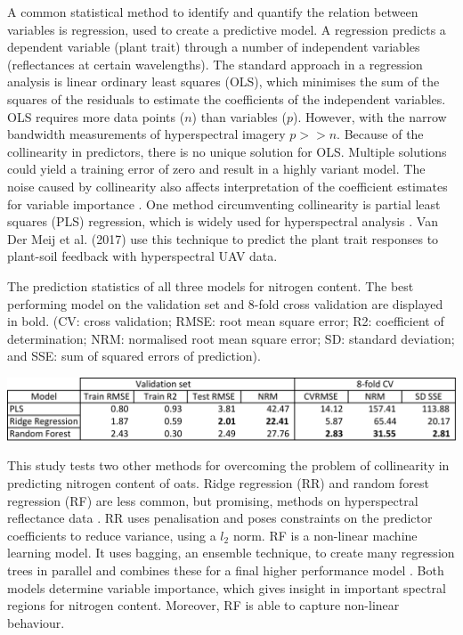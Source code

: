 \documentclass{isprs}
\begin{document}
A common statistical method to identify and quantify the relation between variables is regression, used to create a predictive model. A regression predicts a dependent variable (plant trait) through a number of independent variables (reflectances at certain wavelengths). The standard approach in a regression analysis is linear ordinary least squares (OLS), which minimises the sum of the squares of the residuals to estimate the coefficients of the independent variables. OLS requires more data points ($n$) than variables ($p$). However, with the narrow bandwidth measurements of hyperspectral imagery $p >> n$.  Because of the collinearity in predictors, there is no unique solution for OLS. Multiple solutions could yield a training error of zero and result in a highly variant model. The noise caused by collinearity also affects interpretation of the coefficient estimates for variable importance \cite{Stewart1987}. One method circumventing collinearity is partial least squares (PLS) regression, which is widely used for hyperspectral analysis \cite{Hansen2003,Kawamura2017,VanDerMeij2017}. Van Der Meij et al. (2017) use this technique to predict the plant trait responses to plant-soil feedback with hyperspectral UAV data. 

 \begin{table}
\begin{center}
\caption{The prediction statistics of all three models for nitrogen content. The best performing model on the validation set and 8-fold cross validation are displayed in bold. (CV: cross validation; RMSE: root mean square error; R2: coefficient of determination; NRM: normalised root mean square error; SD: standard deviation; and SSE: sum of squared errors of prediction).}
		\includegraphics[width=1.8\columnwidth]{figures/test_sites/fig1.pdf}
	\label{fig:figure_placement}
\end{center}
\end{table}

This study tests two other methods for overcoming the problem of collinearity in predicting nitrogen content of oats. Ridge regression (RR) and random forest regression (RF) are less common, but promising, methods on hyperspectral reflectance data \cite{Prasad2006,Caicedo2014,Imani2015}. RR uses penalisation and poses constraints on the predictor coefficients to reduce variance, using a $l_2$ norm. RF is a non-linear machine learning model. It uses bagging, an ensemble technique, to create many regression trees in parallel and combines these for a final higher performance model \cite{Breiman2001,Ismail2010}. Both models determine variable importance, which gives insight in important spectral regions for nitrogen content. Moreover, RF is able to capture non-linear behaviour.
\end{document}
